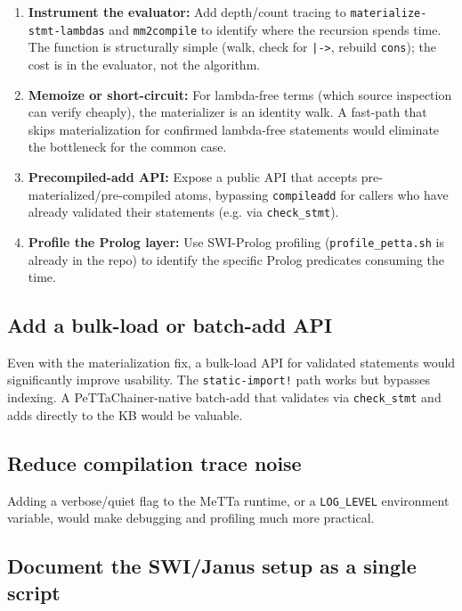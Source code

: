 \documentclass[11pt]{article}
\begin{document}
\begin{enumerate}
  \item \textbf{Instrument the evaluator:} Add depth/count tracing to
  \texttt{materialize-stmt-lambdas} and \texttt{mm2compile} to identify where the
  recursion spends time. The function is structurally simple (walk, check for
  \texttt{|->}, rebuild \texttt{cons}); the cost is in the evaluator, not the
  algorithm.
  \item \textbf{Memoize or short-circuit:} For lambda-free terms (which source
  inspection can verify cheaply), the materializer is an identity walk. A
  fast-path that skips materialization for confirmed lambda-free statements would
  eliminate the bottleneck for the common case.
  \item \textbf{Precompiled-add API:} Expose a public API that accepts
  pre-materialized/pre-compiled atoms, bypassing \texttt{compileadd} for callers
  who have already validated their statements (e.g. via \texttt{check\_stmt}).
  \item \textbf{Profile the Prolog layer:} Use SWI-Prolog profiling
  (\texttt{profile\_petta.sh} is already in the repo) to identify the specific
  Prolog predicates consuming the time.
\end{enumerate}

\subsection{Add a bulk-load or batch-add API}

Even with the materialization fix, a bulk-load API for validated statements would
significantly improve usability. The \texttt{static-import!} path works but
bypasses indexing. A PeTTaChainer-native batch-add that validates via
\texttt{check\_stmt} and adds directly to the KB would be valuable.

\subsection{Reduce compilation trace noise}

Adding a verbose/quiet flag to the MeTTa runtime, or a \texttt{LOG\_LEVEL}
environment variable, would make debugging and profiling much more practical.

\subsection{Document the SWI/Janus setup as a single script}
\end{document}
